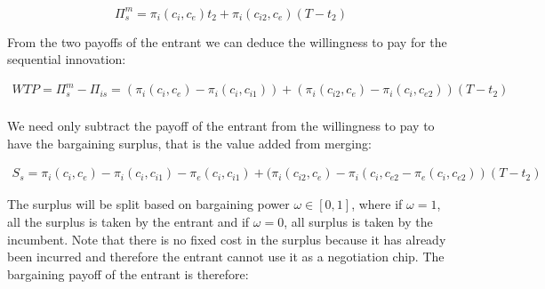 \begin{equation*}
\Pi_{s}^m= \pi_i(c_i,c_{e}) t_2+\pi_i(c_{i2},c_e)(T-t_2)
\end{equation*}

From the two payoffs of the entrant we can deduce the willingness to pay for the sequential innovation: 


\begin{align*}
WTP=\Pi_{s}^m-\Pi_{is} = (\pi_i(c_i,c_{e})-\pi_i(c_i,c_{i1}))+(\pi_i(c_{i2},c_e)-\pi_i(c_{i},c_{e2}))(T-t_2) \\
\end{align*}

We need only subtract the payoff of the entrant from the willingness to pay to have the bargaining surplus, that is the value added from merging:


\begin{align*}
S_s= \pi_i(c_i,c_{e})-\pi_i(c_i,c_{i1})-\pi_e(c_i,c_{i1})+(\pi_i(c_{i2},c_e)-\pi_i(c_{i},c_{e2}-\pi_e(c_{i},c_{e2}))(T-t_2) 
\end{align*}

The surplus will be split based on bargaining power $\omega \in [0,1]$, where if $\omega = 1$, all the surplus is taken by the entrant and if $\omega = 0$, all surplus is taken by the incumbent. Note that there is no fixed cost in the surplus because it has already been incurred and therefore the entrant cannot use it as a negotiation chip. The bargaining payoff of the entrant is therefore:


